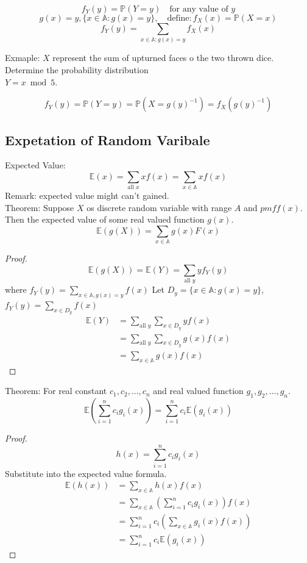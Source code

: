 \documentclass{article}
\newcommand{\E}{\mathbb{E}}
\renewcommand{\P}{\mathbb{P}}
\begin{document}
$$f_{Y}(y) = \P(Y=y) \quad \text{for any value of } y$$
$$g(x) = y, \{x \in \mathbb{A}: g(x) = y\}, \quad \text{define}: f_{X}(x) = \P(X=x)$$
$$f_{Y}(y) = \sum_{{x \in \mathbb{A}: g(x) = y}} f_{X}(x)$$

\noindent Exmaple: $X$ represent the sum of upturned faces o the two thrown dice. Determine the probability distribution \\ $Y = x \bmod 5$.

$$f_{Y}(y) = \P(Y=y)= \P(X=g(y) ^ {-1}) =f_{X}(g(y)^{-1})$$

\subsection{Expetation of Random Varibale}
\noindent Expected Value: \\
$$\E(x) = \sum_{\text{all } x}xf(x) = \sum_{x \in \mathbb{A}} xf(x)$$
\noindent Remark: expected value might can't gained.\\

\noindent Theorem: Suppose $X$ os discrete random variable with range $A$ and $pmf f(x)$. Then the expected value of some real valued function $g(x)$.
$$\E(g(X)) = \sum_{x \in \mathbb{A}} g(x)F(x)$$

\begin{proof}
$$\E(g(X)) = \E(Y) = \sum_{\text{all } y}yf_{Y}(y)$$ where $f_{Y}(y) = \sum_{x \in \mathbb{A}, g(x) = y} f(x)$
Let $D_{y} = \{x \in \mathbb{A}: g(x) = y\}$, $f_{Y}(y) = \sum_{x \in D_{y}} f(x)$
\begin{align*}
   \E(Y) &= \sum_{\text{all } y} \sum_{x \in D_{y}}yf(x) \\
         &= \sum_{\text{all } y} \sum_{x \in D_{y}}g(x)f(x) \\
         &= \sum_{x \in \mathbb{A}}g(x)f(x)
\end{align*}
\end{proof}

\noindent Theorem: For real constant $c_{1}, c_{2}, ... , c_{n}$ and real valued function $g_{1}, g_{2}, ... ,g_{n}$.
$$ \E(\sum_{i = 1}^{n} c_{i}g_{i}(x)) = \sum_{i = 1}^{n}c_{i}\E(g_{i}(x))$$

\begin{proof}
$$h(x) = \sum_{i = 1}^{n} c_{i} g_{i}(x)$$
Substitute into the expected value formula.
\begin{align*}
\E(h(x)) &= \sum_{x \in \mathbb{A}}h(x)f(x) \\
         &= \sum_{x \in \mathbb{A}} (\sum_{i = 1}^{n}c_{i}g_{i}(x))f(x) \\
         &= \sum_{i = 1}^{n}c_{i} (\sum_{x \in \mathbb{A}}g_{i}(x)f(x)) \\
         &= \sum_{i = 1}^{n}c_{i} \E(g_{i}(x))
\end{align*}
\end{proof}
\newpage
\end{document}

